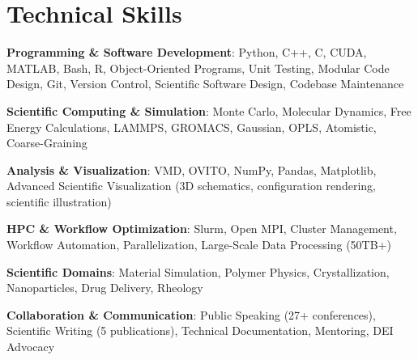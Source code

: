 \section*{Technical Skills}
\begin{tabitemize}
  \item \textbf{Programming \& Software Development}: Python, C++, C, CUDA, MATLAB, Bash, R, Object-Oriented Programs, Unit Testing, Modular Code Design, Git, Version Control, Scientific Software Design, Codebase Maintenance
  \item \textbf{Scientific Computing \& Simulation}: Monte Carlo, Molecular Dynamics, Free Energy Calculations, LAMMPS, GROMACS, Gaussian, OPLS, Atomistic, Coarse-Graining
  \item \textbf{Analysis \& Visualization}: VMD, OVITO, NumPy, Pandas, Matplotlib, Advanced Scientific Visualization (3D schematics, configuration rendering, scientific illustration)
  \item \textbf{HPC \& Workflow Optimization}: Slurm, Open MPI, Cluster Management, Workflow Automation, Parallelization, Large-Scale Data Processing (50TB+)
  \item \textbf{Scientific Domains}: Material Simulation, Polymer Physics, Crystallization, Nanoparticles, Drug Delivery, Rheology
  \item \textbf{Collaboration \& Communication}: Public Speaking (27+ conferences), Scientific Writing (5 publications), Technical Documentation, Mentoring, DEI Advocacy
\end{tabitemize}
